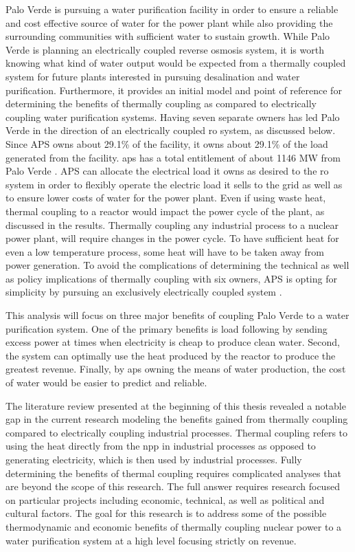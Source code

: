 Palo Verde is pursuing a water purification facility in order to ensure a reliable and cost effective source of water for the power plant while also providing the surrounding communities with sufficient water to sustain growth. While Palo Verde is planning an electrically coupled reverse osmosis system, it is worth knowing what kind of water output would be expected from a thermally coupled system for future plants interested in pursuing desalination and water purification. Furthermore, it provides an initial model and point of reference for determining the benefits of thermally coupling as compared to electrically coupling water purification systems. Having seven separate owners has led Palo Verde in the direction of an electrically coupled \ac{ro} system, as discussed below. Since APS owns about 29.1\% of the facility, it owns about 29.1\% of the load generated from the facility. \ac{aps} has a total entitlement of about 1146 MW from Palo Verde \cite{PinnacleWestCapitalCorporation2016}. APS can allocate the electrical load it owns as desired to the \ac{ro} system in order to flexibly operate the electric load it sells to the grid as well as to ensure lower costs of water for the power plant. Even if using waste heat, thermal coupling to a reactor would impact the power cycle of the plant, as discussed in the results.  Thermally coupling any industrial process to a nuclear power plant, will require changes in the power cycle.  To have sufficient heat for even a low temperature process, some heat will have to be taken away from power generation. To avoid the complications of determining the technical as well as policy implications of thermally coupling with six owners, APS is opting for simplicity by pursuing an exclusively electrically coupled system \cite{Brown2018}.

This analysis will focus on three major benefits of coupling Palo Verde to a water purification system.  One of the primary benefits is load following by sending excess power at times when electricity is cheap to produce clean water. Second, the system can optimally use the heat produced by the reactor to produce the greatest revenue. Finally, by \ac{aps} owning the means of water production, the cost of water would be easier to predict and reliable.

The literature review presented at the beginning of this thesis revealed a notable gap in the current research modeling the benefits gained from thermally coupling compared to electrically coupling industrial processes. Thermal coupling refers to using the heat directly from the \ac{npp} in industrial processes as opposed to generating electricity, which is then used by industrial processes. Fully determining the benefits of thermal coupling requires complicated analyses that are beyond the scope of this research. The full answer requires research focused on particular projects including economic, technical, as well as political and cultural factors. The goal for this research is to address some of the possible thermodynamic and economic benefits of thermally coupling nuclear power to a water purification system at a high level focusing strictly on revenue.

